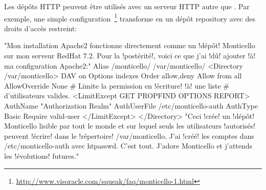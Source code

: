 \documentclass[a4paper,10pt,twoside]{book}
\begin{document}

Les dépôts HTTP peuvent être utilisés avec un serveur HTTP autre que 
 \ind{\sqsrc}. Par exemple, une simple
 configuration~\footnote{\url{http://www.visoracle.com/squeak/faq/monticello-1.html}}
 transforme  en un dépôt \MC repository avec des droits
 d'accès restreint:


\begin{code}{} %
"Mon installation Apache2 fonctionne directement comme un !dépôt! Monticello sur mon
serveur RedHat 7.2. Pour la !postérité!, voici ce que j'ai !dû! ajouter !à! ma configuration
Apache2:"
Alias /monticello/ /var/monticello/
<Directory /var/monticello>
  DAV on
  Options indexes
  Order allow,deny
  Allow from all
  AllowOverride None
  # Limite la permission en !écriture! !à! une liste 
  # d'utilisateurs valides.
  <LimitExcept GET PROPFIND OPTIONS REPORT>
    AuthName "Authorization Realm"
    AuthUserFile /etc/monticello-auth
    AuthType Basic
    Require valid-user
  </LimitExcept>
</Directory>
"Ceci !crée! un !dépôt! Monticello lisible par tout le monde et sur lequel seuls les utilisateurs 
!autorisés! peuvent !écrire! dans le !répertoire! /var/monticello. J'ai !créé! les comptes dans
/etc/monticello-auth avec htpasswd. C'est tout.
J'adore Monticello et j'attends les !évolutions! futures." \end{code} %
 
\end{document}
